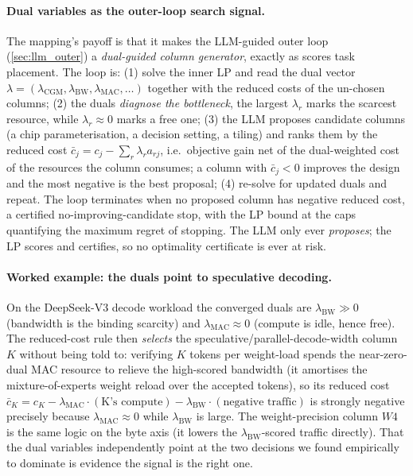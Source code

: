 \paragraph{Dual variables as the outer-loop search signal.}
The mapping's payoff is that it makes the LLM-guided outer loop
(\cref{sec:llm_outer}) a \emph{dual-guided column generator}, exactly as
\citet{cvxcluster2026} scores task placement. The loop is: (1) solve the inner
LP and read the dual vector $\lambda=(\lambda_{\mathrm{CGM}},
\lambda_{\mathrm{BW}},\lambda_{\mathrm{MAC}},\dots)$ together with the reduced costs
of the un-chosen columns; (2) the duals \emph{diagnose the bottleneck}, the
largest $\lambda_r$ marks the scarcest resource, while $\lambda_r\approx0$ marks a
free one; (3) the LLM proposes candidate columns (a chip parameterisation, a decision
setting, a tiling) and ranks them by the reduced cost $\bar c_j = c_j -
\sum_r\lambda_r a_{rj}$, i.e.\ objective gain net of the dual-weighted cost of the
resources the column consumes; a column with $\bar c_j<0$ improves the design and
the most negative is the best proposal; (4) re-solve for updated duals and repeat.
The loop terminates when no proposed column has negative reduced cost, a certified
no-improving-candidate stop, with the LP bound at the caps quantifying the maximum
regret of stopping. The LLM only ever \emph{proposes}; the LP scores and certifies,
so no optimality certificate is ever at risk.

\paragraph{Worked example: the duals point to speculative decoding.}
On the DeepSeek-V3 decode workload the converged duals are $\lambda_{\mathrm{BW}}
\gg 0$ (bandwidth is the binding scarcity) and $\lambda_{\mathrm{MAC}}\approx 0$
(compute is idle, hence free). The reduced-cost rule then \emph{selects} the
speculative/parallel-decode-width column $K$ without being told to: verifying $K$
tokens per weight-load spends the near-zero-dual MAC resource to relieve the
high-scored bandwidth (it amortises the mixture-of-experts weight reload over the
accepted tokens), so its reduced cost $\bar c_K = c_K - \lambda_{\mathrm{MAC}}\cdot(\text{K's
compute}) - \lambda_{\mathrm{BW}}\cdot(\text{negative traffic})$ is strongly
negative precisely because $\lambda_{\mathrm{MAC}}\approx0$ while
$\lambda_{\mathrm{BW}}$ is large. The weight-precision column $W4$ is the same logic
on the byte axis (it lowers the $\lambda_{\mathrm{BW}}$-scored traffic directly).
That the dual variables independently point at the two decisions we found empirically
to dominate is evidence the signal is the right one.


